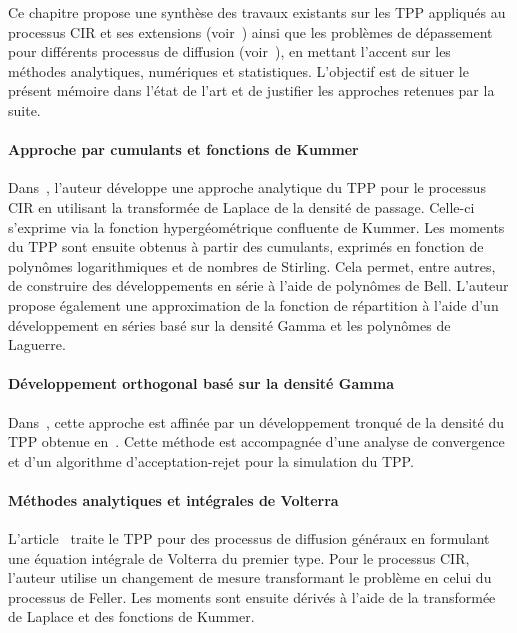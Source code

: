 \label{sec:RevLitt}

Ce chapitre propose une synthèse des travaux existants sur les \acs{TPP} appliqués au processus \acs{CIR} et ses extensions (voir~\cite{dinardo2021,dinardo2024,kepplinger2017,giorno2021,giorno2023,martin2011,masoliver2012}) ainsi que les problèmes de dépassement pour différents processus de diffusion (voir~\cite{kou2003,yin2014,kluppelberg2004}), en mettant l'accent sur les méthodes analytiques, numériques et statistiques. L'objectif est de situer le présent mémoire dans l'état de l'art et de justifier les approches retenues par la suite.

\paragraph{Approche par cumulants et fonctions de Kummer}

Dans~\cite{dinardo2021}, l'auteur développe une approche analytique du \acs{TPP} pour le processus \acs{CIR} en utilisant la transformée de Laplace de la densité de passage. Celle-ci s'exprime via la fonction hypergéométrique confluente de Kummer. Les moments du \acs{TPP} sont ensuite obtenus à partir des cumulants, exprimés en fonction de polynômes logarithmiques et de nombres de Stirling. Cela permet, entre autres, de construire des développements en série à l'aide de polynômes de Bell. L'auteur propose également une approximation de la fonction de répartition à l'aide d'un développement en séries basé sur la densité Gamma et les polynômes de Laguerre.

\paragraph{Développement orthogonal basé sur la densité Gamma}

Dans~\cite{dinardo2024}, cette approche est affinée par un développement tronqué de la densité du \acs{TPP} obtenue en~\cite{dinardo2021}. Cette méthode est accompagnée d'une analyse de convergence et d'un algorithme d'acceptation-rejet pour la simulation du \acs{TPP}.

\paragraph{Méthodes analytiques et intégrales de Volterra}

L'article~\cite{kepplinger2017} traite le \acs{TPP} pour des processus de diffusion généraux en formulant une équation intégrale de Volterra du premier type. Pour le processus \acs{CIR}, l'auteur utilise un changement de mesure transformant le problème en celui du processus de Feller. Les moments sont ensuite dérivés à l'aide de la transformée de Laplace et des fonctions de Kummer.

